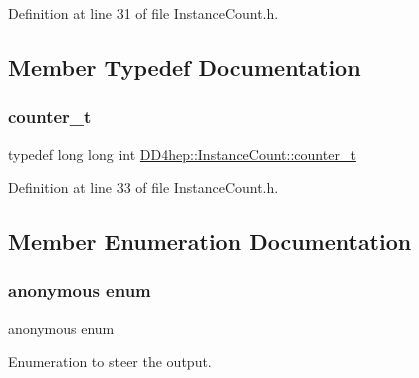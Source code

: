 Definition at line 31 of file Instance\+Count.\+h.



\subsection{Member Typedef Documentation}
\hypertarget{struct_d_d4hep_1_1_instance_count_ae81dc0c76b135425e14b6dc38262a727}{}\label{struct_d_d4hep_1_1_instance_count_ae81dc0c76b135425e14b6dc38262a727} 
\subsubsection{\texorpdfstring{counter\+\_\+t}{counter\_t}}
{\footnotesize\ttfamily typedef long long int \hyperlink{struct_d_d4hep_1_1_instance_count_ae81dc0c76b135425e14b6dc38262a727}{D\+D4hep\+::\+Instance\+Count\+::counter\+\_\+t}}



Definition at line 33 of file Instance\+Count.\+h.



\subsection{Member Enumeration Documentation}
\hypertarget{struct_d_d4hep_1_1_instance_count_ae1ac289e30ac5ae83640ae2ed97f947c}{}\label{struct_d_d4hep_1_1_instance_count_ae1ac289e30ac5ae83640ae2ed97f947c} 
\subsubsection{\texorpdfstring{anonymous enum}{anonymous enum}}
{\footnotesize\ttfamily anonymous enum}



Enumeration to steer the output. 

